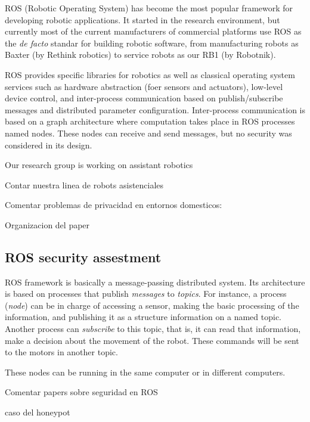 \documentclass[journal,twoside]{JoPhA}
\begin{document}
ROS (Robotic Operating System) \cite{ROS09} has become the most popular framework for developing robotic applications. It started in the research environment, but currently most of the current manufacturers of commercial platforms use ROS as the {\em de facto} standar for building robotic software, from manufacturing robots as Baxter (by Rethink robotics) to service robots as our RB1 (by Robotnik).

ROS provides specific libraries for robotics as well as classical operating system services such as hardware abstraction (foer sensors and actuators), low-level device control, and inter-process communication based on publish/subscribe messages and distributed parameter configuration. Inter-process communication is based on a graph architecture where computation takes place in ROS processes named nodes. These nodes can receive and send messages, but no security was considered in its design.

Our research group is working on assistant robotics




Contar nuestra linea de robots asistenciales \cite{lera}

Comentar problemas de privacidad en entornos domesticos: \cite{Denning09}

Organizacion del paper




\subsection{ROS security assestment}

ROS framework is basically a message-passing distributed system. Its architecture is based on processes that publish {\em messages} to {\em topics}. For instance, a process ({\em node}) can be in charge of accessing a sensor, making the basic processing of the information, and publishing it as a structure information on a named topic. Another process can {\em subscribe} to this topic, that is, it can read that information, make a decision about the movement of the robot. These commands will be sent to the motors in another topic.

These nodes can be running in the same computer or in different computers. 

Comentar papers sobre seguridad en ROS 

caso del honeypot \cite{McClean2013}


\end{document}
